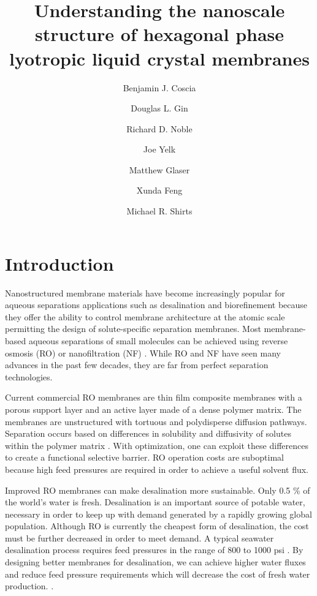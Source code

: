 \documentclass{article}
\title{Understanding the nanoscale structure of hexagonal phase
lyotropic liquid crystal membranes}
\author{Benjamin J. Coscia \and Douglas L. Gin \and Richard D. Noble
\and Joe Yelk \and Matthew Glaser \and Xunda Feng \and Michael R.
Shirts}
\begin{document}
  
  \graphicspath{{./figures/}}
  \maketitle

  \section{Introduction}
  
  Nanostructured membrane materials have become increasingly popular for
  aqueous separations applications such as desalination and biorefinement because
  they offer the ability to control membrane architecture at the atomic scale
  permitting the design of solute-specific separation membranes.
  \cite{humplik_nanostructured_2011} Most membrane-based aqueous separations of
  small molecules can be achieved using reverse osmosis (RO) or nanofiltration
  (NF) \cite{van_der_bruggen_review_2003}. While RO and NF have seen many
  advances in the past few decades, they are far from perfect separation
  technologies. 

  Current commercial RO membranes are thin film composite membranes with a
  porous support layer and an active layer made of a dense polymer matrix. The
  membranes are unstructured with tortuous and polydisperse diffusion pathways.
  Separation occurs based on differences in solubility and diffusivity of solutes
  within the polymer matrix \cite{wijmans_solution-diffusion_1995}. With
  optimization, one can exploit these differences to create a functional
  selective barrier. RO operation costs are suboptimal because high feed
  pressures are required in order to achieve a useful solvent flux. 

  Improved RO membranes can make desalination more sustainable. Only 0.5 \% of
  the world's water is fresh. Desalination is an important source of potable
  water, necessary in order to keep up with demand generated by a rapidly growing
  global population. Although RO is currently the cheapest form of desalination,
  the cost must be further decreased in order to meet demand. A typical seawater
  desalination process requires feed pressures in the range of 800 to 1000 psi
  \cite{fritzmann_state---art_2007}. By designing better membranes for
  desalination, we can achieve higher water fluxes and reduce feed pressure
  requirements which will decrease the cost of fresh water production.
  \cite{humplik_nanostructured_2011}.  
\end{document}
